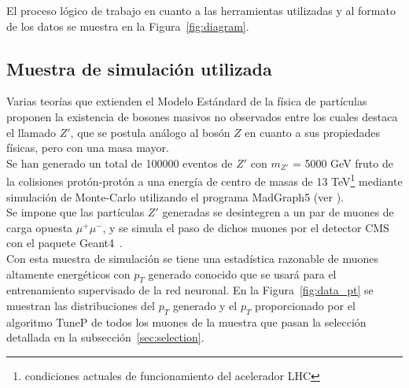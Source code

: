 El proceso l\'ogico de trabajo en cuanto a las herramientas utilizadas y al formato de los datos se muestra en la Figura~\ref{fig:diagram}. 

\begin{center}
\label{fig:diagram}        
\end{center}


\subsection{Muestra de simulaci\'on utilizada}\label{sec:sample}

Varias teor\'ias que extienden el Modelo Est\'andard de la f\'isica de part\'iculas proponen la existencia de bosones masivos no observados entre los cuales destaca el llamado $Z'$, que se postula an\'alogo al bos\'on $Z$ en cuanto a sus propiedades f\'isicas, pero con una masa mayor. \\

Se han generado un total de 100000 eventos de $Z'$ con $m_{Z'}$ = 5000 GeV fruto de la colisiones prot\'on-prot\'on a una energ\'ia de centro de masas de 13 TeV\footnote{condiciones actuales de funcionamiento del acelerador LHC} mediante simulaci\'on de Monte-Carlo utilizando el programa MadGraph5 (ver \cite{generator}). \\
Se impone que las part\'iculas $Z'$ generadas se desintegren a un par de muones de carga opuesta $\mu^{+}\mu^{-}$, y se simula el paso de dichos muones por el detector CMS con el paquete Geant4~\cite{Agostinelli:2002hh}. \\

Con esta muestra de simulaci\'on se tiene una estad\'istica razonable de muones altamente energ\'eticos con $p_{T}$ generado conocido que se usar\'a para el entrenamiento supervisado de la red neuronal. En la Figura~\ref{fig:data_pt} se muestran las distribuciones del $p_{T}$ generado y el $p_{T}$ proporcionado por el algoritmo TuneP de todos los muones de la muestra que pasan la selecci\'on detallada en la subsecci\'on~\ref{sec:selection}.

